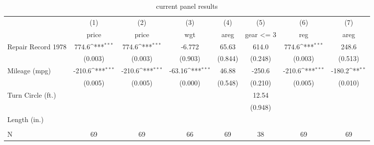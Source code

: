 \begin{table}[htbp]\centering
\def\sym#1{\ifmmode^{#1}\else\(^{#1}\)\fi}
\caption{current panel results}
\begin{tabular}{l*{7}{c}}
\toprule
                    &\multicolumn{1}{c}{(1)}&\multicolumn{1}{c}{(2)}&\multicolumn{1}{c}{(3)}&\multicolumn{1}{c}{(4)}&\multicolumn{1}{c}{(5)}&\multicolumn{1}{c}{(6)}&\multicolumn{1}{c}{(7)}\\
                    &\multicolumn{1}{c}{price}&\multicolumn{1}{c}{price}&\multicolumn{1}{c}{wgt}&\multicolumn{1}{c}{areg}&\multicolumn{1}{c}{gear <= 3}&\multicolumn{1}{c}{reg}&\multicolumn{1}{c}{areg}\\
\midrule
Repair Record 1978  &       774.6\sym{***}&       774.6\sym{***}&      -6.772         &       65.63         &       614.0         &       774.6\sym{***}&       248.6         \\
                    &     (0.003)         &     (0.003)         &     (0.903)         &     (0.844)         &     (0.248)         &     (0.003)         &     (0.513)         \\
\addlinespace
Mileage (mpg)       &      -210.6\sym{***}&      -210.6\sym{***}&      -63.16\sym{***}&       46.88         &      -250.6         &      -210.6\sym{***}&      -180.2\sym{**} \\
                    &     (0.005)         &     (0.005)         &     (0.000)         &     (0.548)         &     (0.210)         &     (0.005)         &     (0.010)         \\
\addlinespace
Turn Circle (ft.)   &                     &                     &                     &                     &       12.54         &                     &                     \\
                    &                     &                     &                     &                     &     (0.948)         &                     &                     \\
\addlinespace
Length (in.)        &                     &                     &                     &                     &                     &                     &                     \\
                    &                     &                     &                     &                     &                     &                     &                     \\
\midrule
N                   &          69         &          69         &          66         &          69         &          38         &          69         &          69         \\

\end{tabular}
\end{table}
